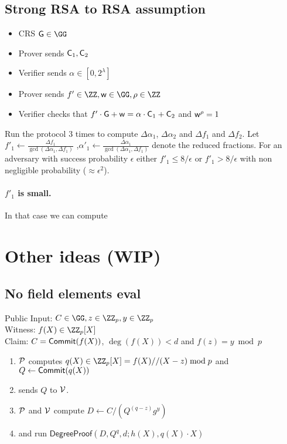 \documentclass[12pt]{article}
\theoremstyle{Definition}
\begin{document}
\subsection{Strong RSA to RSA assumption}
\begin{itemize}
\item CRS $\gr{G} \in \GG$
	\item Prover sends $\mathsf{C}_1,\mathsf{C}_2$
	\item 
Verifier sends $\alpha \in [0,2^\lambda]$
\item Prover sends $f' \in \ZZ, \gr{w}\in \GG, \rho \in \ZZ$
\item Verifier checks that $f' \cdot \mathsf{G}+\mathsf{w} =\alpha \cdot \mathsf{C}_1 +\mathsf{C}_2$ and $\mathsf{w}^\rho=1$
\end{itemize}
Run the protocol 3 times to compute $\Delta\alpha_1$, $\Delta\alpha_2$ and $\Delta f_1$ and $\Delta f_2$.
Let $f'_1\gets \frac{\Delta f_1}{\gcd(\Delta \alpha_1,\Delta f_1)}$ ,$\alpha'_1\gets \frac{\Delta \alpha_1}{\gcd(\Delta \alpha_1,\Delta f_1)}$ denote the reduced fractions. For an adversary with success probability $\epsilon$ either $f'_1\leq 8/\epsilon$ or $f'_1 >8/\epsilon$ with non negligible probability ($\approx\epsilon^2$). 
\paragraph{$f'_1$ is small.}
In that case we can compute 
\section{Other ideas (WIP)}
\subsection{No field elements eval}


\begin{mdframed}
Public Input: $C\in \GG,z\in \ZZ_p,y\in \ZZ_p$\\
Witness: $f(X) \in \ZZ_p[X]$ \\
Claim: $C=\textsf{{Commit}}(f(X))$, $\deg(f(X))<d$ and $f(z)=y \bmod p$
	\begin{enumerate}[nolistsep]
		\item $\mathcal{P}$ computes $q(X) \in \ZZ_p[X]=f(X)//(X-z) \bmod p$ and $Q\gets\textsf{{Commit}}(q(X))$
		\item \prover sends $Q$ to $\mathcal{V}$.
		\item $\mathcal{P}$ and $\mathcal{V}$ compute $D\gets C/(Q^{(q-z)}g^y)$ 

		\item \prover and \verifier run $\textsf{DegreeProof}(D,Q^q,d;h(X),q(X)\cdot X)$
	\end{enumerate}
\end{mdframed}
\end{document}
